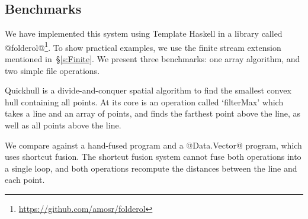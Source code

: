 % 
% 


\subsection{Benchmarks}
We have implemented this system using Template Haskell in a library called @folderol@\footnote{\url{https://github.com/amosr/folderol}}.
To show practical examples, we use the finite stream extension mentioned in~\S\ref{s:Finite}.
We present three benchmarks: one array algorithm, and two simple file operations.


Quickhull is a divide-and-conquer spatial algorithm to find the smallest convex hull containing all points.
At its core is an operation called `filterMax' which takes a line and an array of points, and finds the farthest point above the line, as well as all points above the line.

We compare against a hand-fused program and a @Data.Vector@ program, which uses shortcut fusion.
The shortcut fusion system cannot fuse both operations into a single loop, and both operations recompute the distances between the line and each point.

